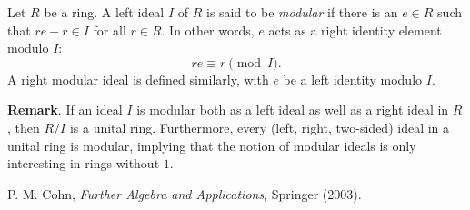 \documentclass[12pt]{article}
\begin{document}
Let $R$ be a ring.  A left ideal $I$ of $R$ is said to be \emph{modular} if there is an $e\in R$ such that $re-r\in I$ for all $r\in R$.  In other words, $e$ acts as a right identity element modulo $I$: $$re\equiv r\pmod I.$$
A right modular ideal is defined similarly, with $e$ be a left identity modulo $I$.  

\textbf{Remark}.  If an ideal $I$ is modular both as a left ideal as well as a right ideal in $R$, then $R/I$ is a unital ring.  Furthermore, every (left, right, two-sided) ideal in a unital ring is modular, implying that the notion of modular ideals is only interesting in rings without $1$.

\begin{thebibliography}{8}
 P. M. Cohn, {\em Further Algebra and Applications}, Springer (2003).
\end{thebibliography}
\end{document}
